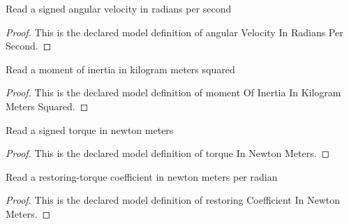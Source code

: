 \begin{definition}
  \label{def:physics:phyx-mini-0264:phyxminiproblems-problemphyxmini0264-angularvelocityinradianspersecond}
  Read a signed angular velocity in radians per second
\end{definition}
\begin{proof}
  This is the declared model definition of angular Velocity In Radians Per Second.
\end{proof}
\begin{definition}
  \label{def:physics:phyx-mini-0264:phyxminiproblems-problemphyxmini0264-momentofinertiainkilogrammeterssquared}
  Read a moment of inertia in kilogram meters squared
\end{definition}
\begin{proof}
  This is the declared model definition of moment Of Inertia In Kilogram Meters Squared.
\end{proof}
\begin{definition}
  \label{def:physics:phyx-mini-0264:phyxminiproblems-problemphyxmini0264-torqueinnewtonmeters}
  Read a signed torque in newton meters
\end{definition}
\begin{proof}
  This is the declared model definition of torque In Newton Meters.
\end{proof}
\begin{definition}
  \label{def:physics:phyx-mini-0264:phyxminiproblems-problemphyxmini0264-restoringcoefficientinnewtonmeters}
  Read a restoring-torque coefficient in newton meters per radian
\end{definition}
\begin{proof}
  This is the declared model definition of restoring Coefficient In Newton Meters.
\end{proof}
